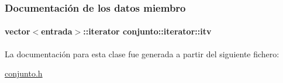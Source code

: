 \subsubsection{Documentación de los datos miembro}
\hypertarget{classconjunto_1_1iterator_a5bd607fdec49c2ab132859bf922e2db6}{
\paragraph[{itv}]{\setlength{\rightskip}{0pt plus 5cm}vector$<${\bf entrada}$>$\-::{\bf iterator} conjunto\-::iterator\-::itv\hspace{0.3cm}{\ttfamily [private]}}}\label{classconjunto_1_1iterator_a5bd607fdec49c2ab132859bf922e2db6}


La documentación para esta clase fue generada a partir del siguiente fichero\-:\begin{DoxyCompactItemize}
\item 
\hyperlink{conjunto_8h}{conjunto.\-h}\end{DoxyCompactItemize}
